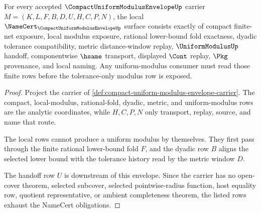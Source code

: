 \begin{theorem}
\label{thm:compact-uniform-modulus-envelope-namecert-obligations}
For every accepted $\CompactUniformModulusEnvelopeUp$ carrier $M=(K,L,F,B,D,U,H,C,P,N)$, the local $\NameCert_{\CompactUniformModulusEnvelopeUp}$ surface consists exactly of compact finite-net exposure, local modulus exposure, rational lower-bound fold exactness, dyadic tolerance compatibility, metric distance-window replay, $\UniformModulusUp$ handoff, componentwise $\hsame$ transport, displayed $\Cont$ replay, $\Pkg$ provenance, and local naming. Any uniform-modulus consumer must read those finite rows before the tolerance-only modulus row is exposed.
\end{theorem}
\begin{proof}
Project the carrier of \autoref{def:compact-uniform-modulus-envelope-carrier}. The compact, local-modulus, rational-fold, dyadic, metric, and uniform-modulus rows are the analytic coordinates, while $H,C,P,N$ only transport, replay, source, and name that route.

The local rows cannot produce a uniform modulus by themselves. They first pass through the finite rational lower-bound fold $F$, and the dyadic row $B$ aligns the selected lower bound with the tolerance history read by the metric window $D$.

The handoff row $U$ is downstream of this envelope. Since the carrier has no open-cover theorem, selected subcover, selected pointwise-radius function, host equality row, quotient representative, or ambient completeness theorem, the listed rows exhaust the NameCert obligations.
\end{proof}

